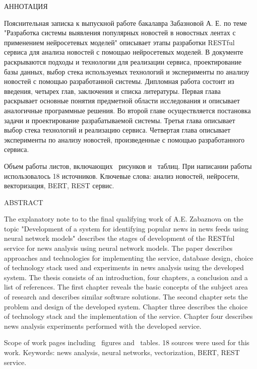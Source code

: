 \begin{center}
	АННОТАЦИЯ
\end{center}

Пояснительная записка к выпускной работе бакалавра Забазновой А. Е. по теме "Разработка системы выявления популярных новостей в новостных лентах с применением нейросетевых моделей" описывает этапы разработки RESTful сервиса для анализа новостей с помощью нейросетевых моделей. В документе раскрываются подходы и технологии для реализации сервиса, проектирование базы данных, выбор стека используемых технологий и эксперименты по анализу новостей с помощью разработанной системы. Дипломная работа состоит из введения, четырех глав, заключения и списка литературы. Первая глава раскрывает основные понятия предметной области исследования и описывает аналогичные программные решения. Во второй главе осуществляется постановка задачи и проектирование разрабатываемой системы. Третья глава описывает выбор стека технологий и реализацию сервиса. Четвертая глава описывает эксперименты по анализу новостей, произведенные с помощью разработанного сервиса.

Объем работы \pageref{LastPage} листов, включающих \totalfigures ~рисунков и \totaltables ~таблиц. При написании работы использовалось 18 источников. Ключевые слова: анализ  новостей, нейросети, векторизация, BERT, REST сервис.

\pagebreak

\begin{center}
	ABSTRACT
\end{center}

The explanatory note to  to the final qualifying work of  A.E. Zabaznova on the topic "Development of a system for identifying popular news in news feeds using neural network models"  describes the stages of development of the RESTful service for news analysis using neural network models. The paper describes approaches and technologies for implementing the service, database design, choice of technology stack used and experiments in news analysis using the developed system. The thesis consists of an introduction, four chapters, a conclusion and a list of references. The first chapter reveals the basic concepts of the subject area of research and describes similar software solutions. The second chapter sets the problem and design of the developed system. Chapter three describes the choice of technology stack and the implementation of the service. Chapter four describes news analysis experiments performed with the developed service.

Scope of work \pageref{LastPage} pages including \totalfigures ~figures and
\totaltables ~tables. 18 sources were used for this work. Keywords: news analysis, neural networks, vectorization, BERT, REST service.
